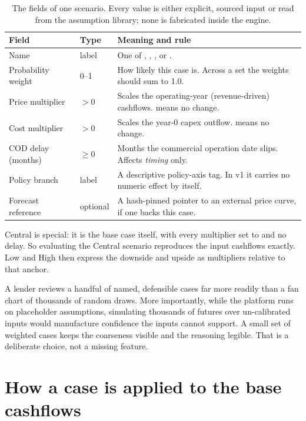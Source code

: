 \begin{table}[H]
\centering
\caption{The fields of one scenario. Every value is either explicit, sourced input or read from the assumption library; none is fabricated inside the engine.}
\label{tab:scenariofields}
\small\sffamily
\begin{tabularx}{\textwidth}{@{}l l L@{}}
\toprule
\textbf{Field} & \textbf{Type} & \textbf{Meaning and rule} \\
\midrule
Name & label & One of , , , or . \\
Probability weight & 0--1 & How likely this case is. Across a set the weights should sum to 1.0. \\
Price multiplier & $>0$ & Scales the operating-year (revenue-driven) cashflows.  means no change. \\
Cost multiplier & $>0$ & Scales the year-0 capex outflow.  means no change. \\
COD delay (months) & $\geq 0$ & Months the commercial operation date slips. Affects \emph{timing} only. \\
Policy branch & label & A descriptive policy-axis tag. In v1 it carries no numeric effect by itself. \\
Forecast reference & optional & A hash-pinned pointer to an external price curve, if one backs this case. \\
\bottomrule
\end{tabularx}
\end{table}

Central is special: it is the base case itself, with every multiplier set to  and no delay. So evaluating the Central scenario reproduces the input cashflows exactly. Low and High then express the downside and upside as multipliers relative to that anchor.

\begin{keyidea}
A lender reviews a handful of named, defensible cases far more readily than a fan chart of thousands of random draws. More importantly, while the platform runs on placeholder assumptions, simulating thousands of futures over un-calibrated inputs would manufacture confidence the inputs cannot support. A small set of weighted cases keeps the coarseness visible and the reasoning legible. That is a deliberate choice, not a missing feature.
\end{keyidea}

\section{How a case is applied to the base cashflows}

